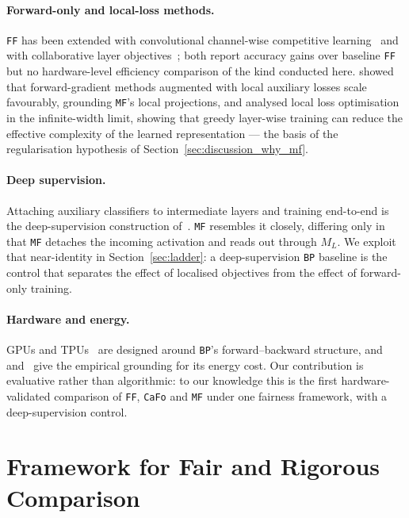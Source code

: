 \documentclass{llncs}
\newcommand{\FF}{\texttt{FF}}
\newcommand{\MF}{\texttt{MF}}
\newcommand{\BP}{\texttt{BP}}
\newcommand{\CaFo}{\texttt{CaFo}}
\begin{document}
\paragraph{Forward-only and local-loss methods.}
\FF{} has been extended with convolutional channel-wise competitive
learning~\cite{papachristodoulou2024convolutional} and with collaborative
layer objectives~\cite{lorberbom2024layer}; both report accuracy gains over
baseline \FF{} but no hardware-level efficiency comparison of the kind
conducted here. \cite{ren2023scaling} showed that forward-gradient methods
augmented with local auxiliary losses scale favourably, grounding \MF{}'s
local projections, and \cite{ishikawa2025local} analysed local loss
optimisation in the infinite-width limit, showing that greedy layer-wise
training can reduce the effective complexity of the learned representation ---
the basis of the regularisation hypothesis of
Section~\ref{sec:discussion_why_mf}.

\paragraph{Deep supervision.}
Attaching auxiliary classifiers to intermediate layers and training end-to-end
is the deep-supervision construction of~\cite{lee2015deeply}. \MF{} resembles
it closely, differing only in that \MF{} detaches the incoming activation and
reads out through $M_L$. We exploit that near-identity in
Section~\ref{sec:ladder}: a deep-supervision \BP{} baseline is the control
that separates the effect of localised objectives from the effect of
forward-only training.

\paragraph{Hardware and energy.}
GPUs and TPUs~\cite{jouppi2017datacenter} are designed around \BP{}'s
forward--backward structure, and \cite{strubell2019energy}
and~\cite{patterson2021carbon} give the empirical grounding for its energy
cost. Our contribution is evaluative rather than algorithmic: to our knowledge
this is the first hardware-validated comparison of \FF{}, \CaFo{} and \MF{}
under one fairness framework, with a deep-supervision control.

\section{Framework for Fair and Rigorous Comparison}
\label{sec:framework}
\end{document}
